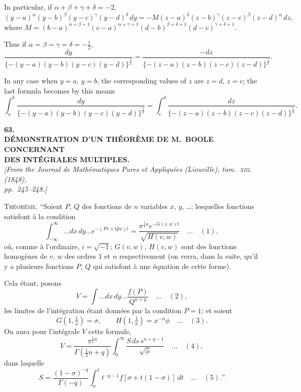 \documentclass[11pt]{article}
\begin{document}
In particular, if $\alpha + \beta + \gamma + \delta = -2$,
\[
(y - a)^{\alpha}(y - b)^{\beta}(y - c)^{\gamma}(y - d)^{\delta}\,dy = -M(z - a)^{\delta}(z - b)^{\gamma}(z - c)^{\beta}(z - d)^{\alpha}\,dz,
\]
where $M = (b - a)^{\alpha + \beta + 1}(c - a)^{\alpha + \gamma + 1}(d - b)^{\beta + \delta + 1}(d - c)^{\gamma + \delta + 1}$.

\medskip
Thus if $\alpha = \beta = \gamma = \delta = -\tfrac{1}{2}$,
\[
\frac{dy}{\{-(y-a)(y-b)(y-c)(y-d)\}^{\frac{1}{2}}}
= \frac{-dz}{\{-(z-a)(z-b)(z-c)(z-d)\}^{\frac{1}{2}}}.
\]

In any case when $y = a$, $y = b$, the corresponding values of $z$ are $z = d$, $z = c$; the
last formula becomes by this means
\[
\int_{a}^{b}\frac{dy}{\{-(y-a)(y-b)(y-c)(y-d)\}^{\frac{1}{2}}}
= \int_{c}^{d}\frac{dz}{\{-(z-a)(z-b)(z-c)(z-d)\}^{\frac{1}{2}}}.
\]

\bigskip

\begin{center}
\textbf{\large 63.}\\[0.7em]
\textbf{\large D\'EMONSTRATION D'UN TH\'EOR\`EME DE M.~BOOLE CONCERNANT}\\[0.3em]
\textbf{\large DES INT\'EGRALES MULTIPLES.}\\[0.5em]
\textit{[From the Journal de Math\'ematiques Pures et Appliqu\'ees (Liouville), tom.~\textsc{xiii}. (1848),\\
pp.~245--248.]}
\end{center}

\medskip

\noindent\textsc{Th\'eor\`eme.} ``Soient $P$, $Q$ des fonctions de $n$ variables $x$, $y$, \ldots; lesquelles fonctions
satisfont \`a la condition
\[
\int_{-\infty}^{\infty}\ldots dx\,dy\ldots e^{-(Pv + Qw)t} = \frac{\pi^{\frac{1}{2}n}e^{-G(v,w)t}}{\sqrt{H(v,w)}}\quad\ldots\quad (1),
\]
o\`u, comme \`a l'ordinaire, $i = \sqrt{-1}$; $G(v, w)$, $H(v, w)$ sont des fonctions homog\`enes
de $v$, $w$ des ordres 1 et $n$ respectivement (on verra, dans la suite, qu'il y a plusieurs
fonctions $P$, $Q$ qui satisfont \`a une \'equation de cette forme).

\medskip
Cela \'etant, posons
\[
V = \int\ldots dx\,dy\ldots \frac{f(P)}{Q^{n+q}}\quad\ldots\quad (2),
\]
les limites de l'int\'egration \'etant donn\'ees par la condition $P = 1$; et soient
\[
G\!\left(1, \tfrac{1}{x}\right) = \sigma,\qquad H\!\left(1, \tfrac{1}{x}\right) = x^{-n}\phi\quad\ldots\quad (3).
\]
On aura pour l'int\'egrale $V$ cette formule,
\[
V = \frac{\pi^{\frac{1}{2}n}}{\Gamma(\frac{1}{2}n + q)}\int_{0}^{\infty}\frac{S\,ds\,s^{n+q-1}}{\sqrt{\phi}}\quad\ldots\quad (4),
\]
dans laquelle
\[
S = \frac{(1 - \sigma)^{-q}}{\Gamma(-q)}\int_{\sigma}^{1}t^{-q-1}f[\sigma + t(1 - \sigma)]\,dt\quad\ldots\quad (5).\text{''}
\]
\end{document}
